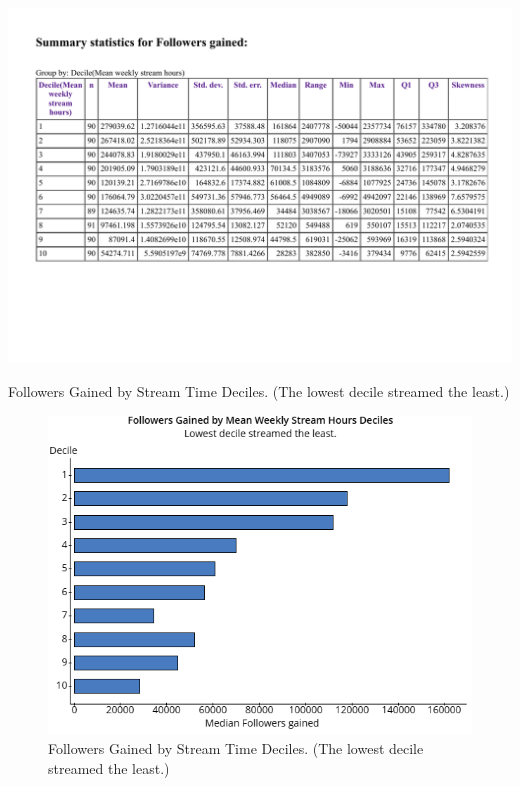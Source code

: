 \documentclass[12pt]{article}
\begin{document}
\begin{table}[H]
  \centering %
  \includegraphics[width=0.9\linewidth]{../StatCrunch_Results/followers_gained_stream_deciles/table}
  \captionsetup{justification=centering, singlelinecheck=false, margin=2cm}
  \caption[Followers Gained by Stream Time Deciles]{Followers Gained by Stream Time Deciles. (The lowest decile streamed the least.)}
  \label{table:followers_gained_stream_decile_table}
\end{table}


\begin{figure}[H]
  \centering %
  \includegraphics[width=0.6\linewidth]{../StatCrunch_Results/followers_gained_stream_deciles/barplot}
  \captionsetup{justification=centering, singlelinecheck=false, margin=2cm}
  \caption[Followers Gained by Stream Time Deciles]{Followers Gained by Stream Time Deciles. (The lowest decile streamed the least.)}
  \label{fig:followers_gained_stream_deciles}
\end{figure}
\end{document}
